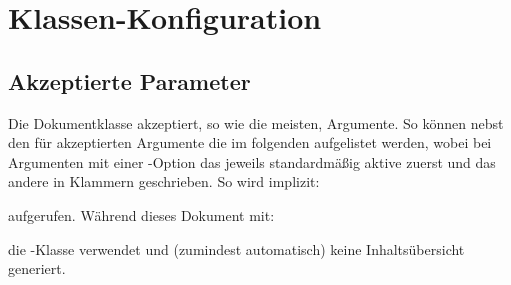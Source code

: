 \documentclass[useartcl,notoc]{sopra-paper}
\begin{document}
%
%
%
%

\section{Klassen-Konfiguration}
    \subsection{Akzeptierte Parameter}
    Die Dokumentklasse akzeptiert, so wie die meisten, Argumente. So können
    nebst den für  akzeptierten Argumente die im folgenden
    aufgelistet werden, wobei bei Argumenten mit einer -Option
    das jeweils standardmäßig aktive zuerst und das andere in Klammern
    geschrieben. So wird implizit:
    aufgerufen. Während dieses Dokument mit:
    die -Klasse verwendet und (zumindest automatisch) keine Inhaltsübersicht generiert.
\end{document}

